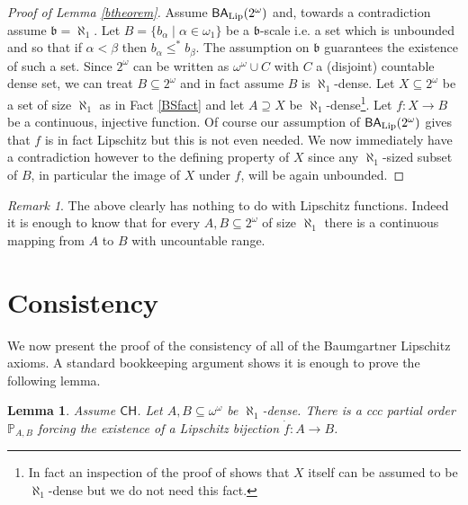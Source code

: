 \documentclass[leqno,11pt]{amsart}
\newtheorem{lemma}[theorem]{Lemma}
\theoremstyle{definition}
\theoremstyle{remark}
\newtheorem{remark}{Remark}
\def\BA{\mathsf{BA}}
\def\baire{\omega^\omega}
\def\mfb{\mathfrak b}
\def\CH {\mathsf{CH}}
\def\P{\mathbb P}
\begin{document}
\begin{proof}[Proof of Lemma \ref{btheorem}]
  Assume $\BA_{\rm Lip}(2^\omega)$ and, towards a contradiction assume $\mfb = \aleph_1$. Let $B = \{b_\alpha \; | \; \alpha \in \omega_1\}$ be a $\mfb$-scale i.e. a set which is unbounded and so that if $\alpha < \beta$ then $b_\alpha \leq^* b_\beta$. The assumption on $\mfb$ guarantees the existence of such a set. Since $2^\omega$ can be written as $\baire \cup C$ with $C$ a (disjoint) countable dense set, we can treat $B \subseteq 2^\omega$ and in fact assume $B$ is $\aleph_1$-dense. Let $X \subseteq 2^\omega$ be a set of size $\aleph_1$ as in Fact \ref{BSfact} and let $A \supseteq X$ be $\aleph_1$-dense\footnote{In fact an inspection of the proof of \cite[Theorem 1]{continuousimagesofsetsofreals} shows that $X$ itself can be assumed to be $\aleph_1$-dense but we do not need this fact.}. Let $f:X \to B$ be a continuous, injective function. Of course our assumption of $\BA_{\rm Lip}(2^\omega)$ gives that $f$ is in fact Lipschitz but this is not even needed. We now immediately have a contradiction however to the defining property of $X$ since any $\aleph_1$-sized subset of $B$, in particular the image of $X$ under $f$, will be again unbounded. 
\end{proof}

\begin{remark}
    The above clearly has nothing to do with Lipschitz functions. Indeed it is enough to know that for every $A, B \subseteq 2^\omega$ of size $\aleph_1$ there is a continuous mapping from $A$ to $B$ with uncountable range. 
\end{remark}

\section{Consistency}
We now present the proof of the consistency of all of the Baumgartner Lipschitz axioms. A standard bookkeeping argument shows it is enough to prove the following lemma. 

\begin{lemma}
    Assume $\CH$. Let $A, B \subseteq \baire$ be $\aleph_1$-dense. There is a ccc partial order $\P_{A, B}$ forcing the existence of a Lipschitz bijection $\dot{f}:A \to B$. \label{consistencylemma}
\end{lemma}
\end{document}
